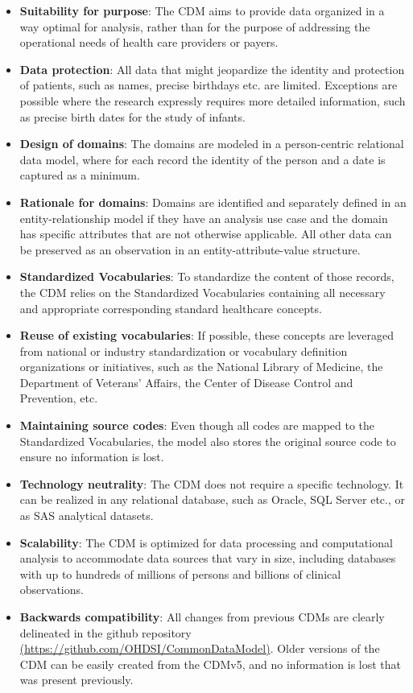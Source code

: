 \documentclass[11pt]{book}
\providecommand{\tightlist}{%
  \setlength{\itemsep}{0pt}\setlength{\parskip}{0pt}}
\theoremstyle{definition}
\theoremstyle{definition}
\theoremstyle{definition}
\theoremstyle{remark}
\begin{document}
\begin{itemize}
\tightlist
\item
  \textbf{Suitability for purpose}: The CDM aims to provide data organized in a way optimal for analysis, rather than for the purpose of addressing the operational needs of health care providers or payers.
\item
  \textbf{Data protection}: All data that might jeopardize the identity and protection of patients, such as names, precise birthdays etc. are limited. Exceptions are possible where the research expressly requires more detailed information, such as precise birth dates for the study of infants.
\item
  \textbf{Design of domains}: The domains are modeled in a person-centric relational data model, where for each record the identity of the person and a date is captured as a minimum.
\item
  \textbf{Rationale for domains}: Domains are identified and separately defined in an entity-relationship model if they have an analysis use case and the domain has specific attributes that are not otherwise applicable. All other data can be preserved as an observation in an entity-attribute-value structure.
\item
  \textbf{Standardized Vocabularies}: To standardize the content of those records, the CDM relies on the Standardized Vocabularies containing all necessary and appropriate corresponding standard healthcare concepts.
\item
  \textbf{Reuse of existing vocabularies}: If possible, these concepts are leveraged from national or industry standardization or vocabulary definition organizations or initiatives, such as the National Library of Medicine, the Department of Veterans' Affairs, the Center of Disease Control and Prevention, etc.
\item
  \textbf{Maintaining source codes}: Even though all codes are mapped to the Standardized Vocabularies, the model also stores the original source code to ensure no information is lost.
\item
  \textbf{Technology neutrality}: The CDM does not require a specific technology. It can be realized in any relational database, such as Oracle, SQL Server etc., or as SAS analytical datasets.
\item
  \textbf{Scalability}: The CDM is optimized for data processing and computational analysis to accommodate data sources that vary in size, including databases with up to hundreds of millions of persons and billions of clinical observations.
\item
  \textbf{Backwards compatibility}: All changes from previous CDMs are clearly delineated in the github repository \href{https://github.com/OHDSI/CommonDataModel}{(https://github.com/OHDSI/CommonDataModel)}. Older versions of the CDM can be easily created from the CDMv5, and no information is lost that was present previously.
\end{itemize}
\end{document}
